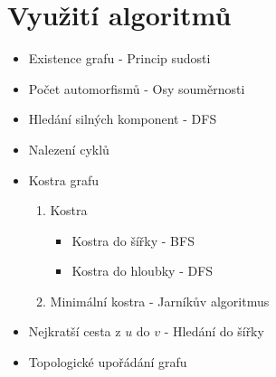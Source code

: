 \section{Využití algoritmů}
  \begin{itemize}
    \item Existence grafu - Princip sudosti
    \item Počet automorfismů - Osy souměrnosti
    \item Hledání silných komponent - DFS
    \item Nalezení cyklů
    \item Kostra grafu
      \begin{enumerate}
        \item Kostra
          \begin{itemize}
            \item Kostra do šířky - BFS
            \item Kostra do hloubky - DFS
          \end{itemize}
        \item Minimální kostra - Jarníkův algoritmus
      \end{enumerate}
    \item Nejkratší cesta z $u$ do $v$ - Hledání do šířky
    \item Topologické upořádání grafu
  \end{itemize}
